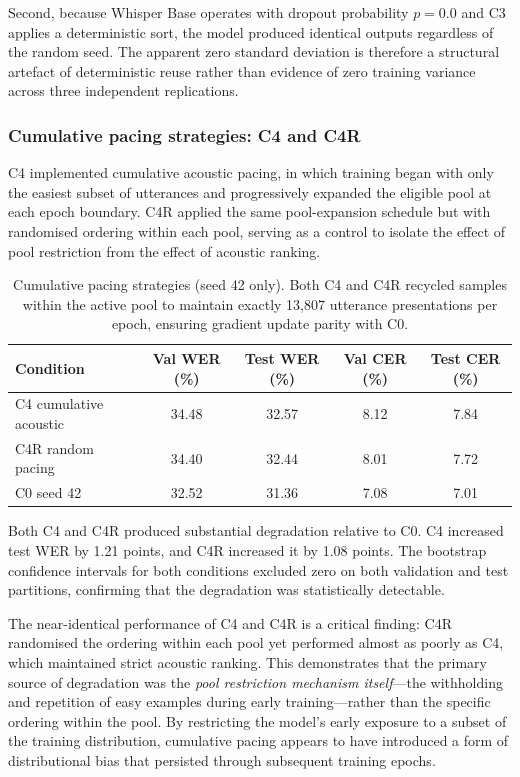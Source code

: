 Second, because Whisper Base operates with dropout probability $p = 0.0$ and C3
applies a deterministic sort, the model produced identical outputs regardless of
the random seed. The apparent zero standard deviation is therefore a structural
artefact of deterministic reuse rather than evidence of zero training variance
across three independent replications.


\subsubsection{Cumulative pacing strategies: C4 and C4R}

C4 implemented cumulative acoustic pacing, in which training began with only the
easiest subset of utterances and progressively expanded the eligible pool at each
epoch boundary. C4R applied the same pool-expansion schedule but with randomised
ordering within each pool, serving as a control to isolate the effect of pool
restriction from the effect of acoustic ranking.

\begin{table}[H]
\centering
\caption{Cumulative pacing strategies (seed 42 only). Both C4 and C4R recycled
samples within the active pool to maintain exactly 13{,}807 utterance
presentations per epoch, ensuring gradient update parity with C0.}
\label{tab:c4-pacing}
\begin{tabular}{lcccc}
\hline
\textbf{Condition} & \textbf{Val WER (\%)} & \textbf{Test WER (\%)} & \textbf{Val CER (\%)} & \textbf{Test CER (\%)} \\
\hline
C4 cumulative acoustic & 34.48 & 32.57 & 8.12 & 7.84 \\
C4R random pacing      & 34.40 & 32.44 & 8.01 & 7.72 \\
\hline
C0 seed 42             & 32.52 & 31.36 & 7.08 & 7.01 \\
\hline
\end{tabular}
\end{table}

Both C4 and C4R produced substantial degradation relative to C0. C4 increased
test WER by 1.21 points, and C4R increased it by 1.08 points. The bootstrap
confidence intervals for both conditions excluded zero on both validation and
test partitions, confirming that the degradation was statistically detectable.

The near-identical performance of C4 and C4R is a critical finding: C4R
randomised the ordering within each pool yet performed almost as poorly as C4,
which maintained strict acoustic ranking. This demonstrates that the primary
source of degradation was the \textit{pool restriction mechanism itself}---the
withholding and repetition of easy examples during early training---rather than
the specific ordering within the pool. By restricting the model's early exposure
to a subset of the training distribution, cumulative pacing appears to have
introduced a form of distributional bias that persisted through subsequent
training epochs.


